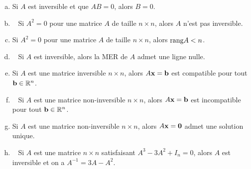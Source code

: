 \begin{prob}
\begin{enumerate}[a)]
\medskip
\item Si $A$ est inversible et que $AB=0$, alors $B=0$.
\medskip


\item\sov~  Si $A^2=0$ pour une matrice $A$ de taille $n\times n$, alors $A$ n'est pas inversible.
\medskip

\item Si $A^2=0$ pour une matrice $A$ de taille $n\times n$, alors $\textrm{rang} A<n$.
\medskip

\item\sov~ Si $A$ est inversible, alors la MER de $A$ admet une ligne nulle.
\medskip

\item Si $ A $ est une matrice inversible $ n\times n$, alors $A\mathbf{x}=\mathbf{b}$ est compatible pour tout $\mathbf{b}\in\mathbb{R}^n$.
\medskip

\item\sov~ Si $ A $ est une matrice non-inversible $ n\times n$, alors $A\mathbf{x}=\mathbf{b}$ est incompatible pour tout $\mathbf{b} \in \mathbb{R}^n$.
\medskip

\item Si $ A $ est une matrice non-inversible $ n\times n$, alors $A\mathbf{x}=\mathbf{0}$ admet une solution unique.
\medskip

\item\sov~ Si $A$ est une matrice $ n\times n$  satisfaisant $A^{3}-3A^{2}+I_{n}=0$, alors $A$ est inversible et on a  $A^{-1}=3A-A^{2}$.
\medskip

\end{enumerate}

\end{prob}

